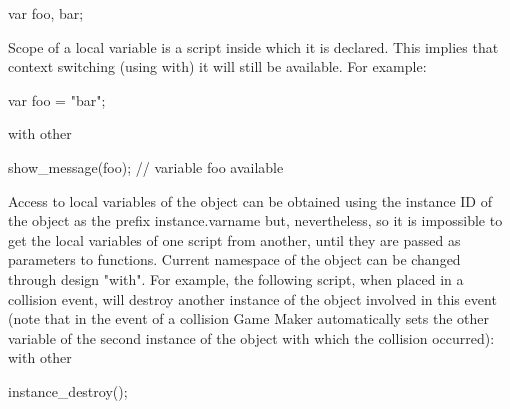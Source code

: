 \documentclass[12pt]{article}
\begin{document}
var foo, bar;{}

Scope of a local variable is a script inside which it is declared. This implies that context switching (using with) it will still be available. For example:{}

var foo = "bar";{}

with other{}

{{}

show_message(foo); // variable foo available{}

}{}

Access to local variables of the object can be obtained using the instance ID of the object as the prefix
instance.varname but, nevertheless, so it is impossible to get the local variables of one script from another, until they are passed as parameters to functions. Current namespace of the object can be changed through design "with". For example, the following script, when placed in a collision event, will destroy another instance of the object involved in this event (note that in the event of a collision Game Maker automatically sets the other variable of the second instance of the object with which the collision occurred):
with other{}

{{}

instance_destroy();{}

}{}
\end{document}
